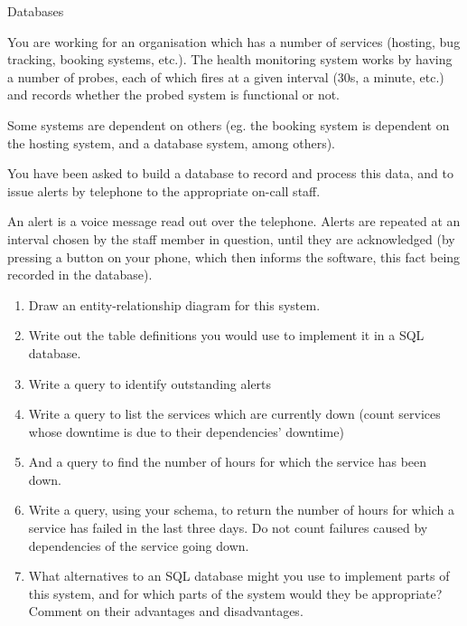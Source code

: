 \documentclass{tripos}  %
\begin{document}
\begin{question}[MockIA,year=2024,paper=1,question=1,author=rrw]{Databases}



  You are working for an organisation which has a number of services
  (hosting, bug tracking, booking systems, etc.). The health
  monitoring system works by having a number of probes, each of which
  fires at a given interval (30s, a minute, etc.) and records whether
  the probed system is functional or not.

  Some systems are dependent on others (eg. the booking system is
  dependent on the hosting system, and a database system, among
  others).

  You have been asked to build a database to record and process this
  data, and to issue alerts by telephone to the appropriate on-call
  staff.

  An alert is a voice message read out over the telephone. Alerts are
  repeated at an interval chosen by the staff member in question,
  until they are acknowledged (by pressing a button on your phone,
  which then informs the software, this fact being recorded in the
  database).

\begin{enumerate}
\item Draw an entity-relationship diagram for this system. 
\item Write out the table definitions you would use to implement it in a SQL database.
\item Write a query to identify outstanding alerts 
\item Write a query to list the services which are currently down (count services whose downtime is due to their dependencies' downtime) 
\item And a query to find the number of hours for which the service has been down. 
\item Write a query, using your schema, to return the number of hours for which a service has failed in the last three days. Do not count failures caused by dependencies of the service going down. 
\item What alternatives to an SQL database might you use to implement parts of this system, and for which parts of the system would they be appropriate? Comment on their advantages and disadvantages.



\end{enumerate}
\end{question}
\end{document}
